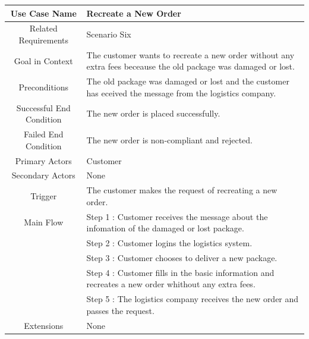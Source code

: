 \documentclass[12pt]{scrreprt}
\begin{document}
\begin{table}
  \centering
  \begin{tabular}{| c | p{11cm} |}
    \hline
    Use Case Name & Recreate a New Order\\
    \hline
    Related Requirements & Scenario Six\\
    \hline
    Goal in Context & The customer wants to recreate a new order without any
    extra fees beceause the old package was damaged or lost.\\
    \hline
    Preconditions & The old package was damaged or lost and the customer has
    eceived the message from the logistics company.\\
    \hline
    Successful End Condition & The new order is placed successfully.\\
    \hline
    Failed End Condition & The new order is non-compliant and rejected.\\
    \hline
    Primary Actors & Customer\\
    \hline
    Secondary Actors & None\\
    \hline
    Trigger & The customer makes the request of recreating a new order.\\
    \hline
    Main Flow & Step 1 : Customer receives the message about the infomation
    of the damaged or lost package.\\
    & Step 2 : Customer logins the logistics system.\\
    & Step 3 : Customer chooses to deliver a new package.\\
    & Step 4 : Customer fills in the basic information and recreates a new
    order whithout any extra fees.\\
    & Step 5 : The logistics company receives the new order and passes
    the request.\\
    \hline
    Extensions & None\\
    \hline
  \end{tabular}
\end{table}
\end{document}
